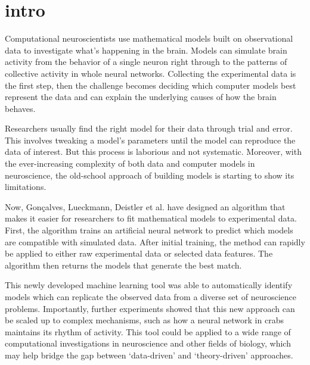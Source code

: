 




\section{intro}

Computational neuroscientists use mathematical models built on observational data to investigate what’s happening in the brain. Models can simulate brain activity from the behavior of a single neuron right through to the patterns of collective activity in whole neural networks. Collecting the experimental data is the first step, then the challenge becomes deciding which computer models best represent the data and can explain the underlying causes of how the brain behaves.

Researchers usually find the right model for their data through trial and error. This involves tweaking a model’s parameters until the model can reproduce the data of interest. But this process is laborious and not systematic. Moreover, with the ever-increasing complexity of both data and computer models in neuroscience, the old-school approach of building models is starting to show its limitations.

Now, Gonçalves, Lueckmann, Deistler et al. have designed an algorithm that makes it easier for researchers to fit mathematical models to experimental data. First, the algorithm trains an artificial neural network to predict which models are compatible with simulated data. After initial training, the method can rapidly be applied to either raw experimental data or selected data features. The algorithm then returns the models that generate the best match.

This newly developed machine learning tool was able to automatically identify models which can replicate the observed data from a diverse set of neuroscience problems. Importantly, further experiments showed that this new approach can be scaled up to complex mechanisms, such as how a neural network in crabs maintains its rhythm of activity. This tool could be applied to a wide range of computational investigations in neuroscience and other fields of biology, which may help bridge the gap between ‘data-driven’ and ‘theory-driven’ approaches.


